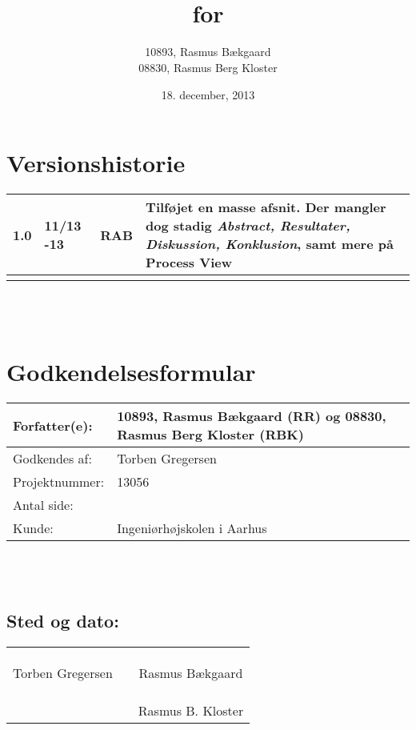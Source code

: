 \documentclass[oneside, 12pt]{memoir}
\title{\DocumentType \\ for \\ \ProjectName}
\date{18. december, 2013}
\author{10893, Rasmus Bækgaard\\08830, Rasmus Berg Kloster}
\begin{document}
\begin{titlingpage} 
  \maketitle
\end{titlingpage}


\section*{Versionshistorie}
\begin{tabular}{p{}|p{}|p{}|p{}}
1.0 & 11/13 -13 & RAB & Tilføjet en masse afsnit. Der mangler dog stadig \textit{Abstract,  Resultater, Diskussion, Konklusion}, samt mere på Process View \\ \hline 
& & & \\ 
\end{tabular} 
\\
\\
\section*{Godkendelsesformular}
\begin{tabular}{p{}|p{}}
\hline 
Forfatter(e): & 10893, Rasmus Bækgaard (RR) og 08830, Rasmus Berg Kloster (RBK)\\ 
\hline 
Godkendes af: & Torben Gregersen \\ 
\hline
Projektnummer: & 13056\\
\hline
Antal side: & \pageref{LastPage} \\
\hline 
Kunde: & Ingeniørhøjskolen i Aarhus \\
\hline
\end{tabular} 
\\
\\
\subsection*{Sted og dato:}
\begin{tabular}{c p{} c}
&& \\
&& \\
\underline{\qquad \qquad \qquad \qquad \qquad \qquad \qquad} & \qquad & \underline{\qquad \qquad \qquad \qquad \qquad \qquad \qquad}  \\ 
Torben Gregersen & & Rasmus Bækgaard \\ \\\\
&&  \underline{\qquad \qquad \qquad \qquad \qquad \qquad \qquad}  \\
& & Rasmus B. Kloster
\end{tabular} 
\end{document}
